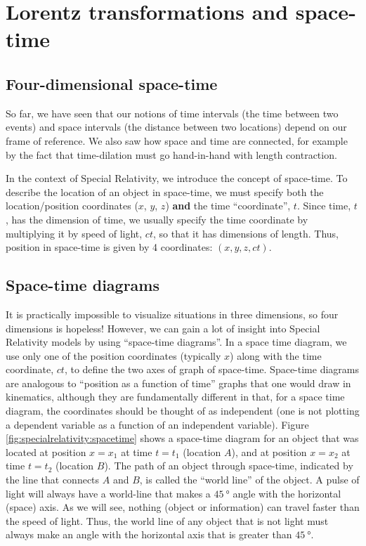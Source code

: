 \section{Lorentz transformations and space-time}
\subsection{Four-dimensional space-time}
So far, we have seen that our notions of time intervals (the time between two events) and space intervals (the distance between two locations) depend on our frame of reference. We also saw how space and time are connected, for example by the fact that time-dilation must go hand-in-hand with length contraction.

In the context of Special Relativity, we introduce the concept of space-time. To describe the location of an object in space-time, we must specify both the location/position coordinates ($x$, $y$, $z$) \textbf{and} the time ``coordinate'', $t$. Since time, $t$, has the dimension of time, we usually specify the time coordinate by multiplying it by speed of light, $ct$, so that it has dimensions of length. Thus, position in space-time is given by 4 coordinates: $(x,y,z,ct)$.

 
\subsection{Space-time diagrams}
It is practically impossible to visualize situations in three dimensions, so four dimensions is hopeless! However, we can gain a lot of insight into Special Relativity models by using ``space-time diagrams''. In a space time diagram, we use only one of the position coordinates (typically $x$) along with the time coordinate, $ct$, to define the two axes of graph of space-time. Space-time diagrams are analogous to ``position as a function of time'' graphs that one would draw in kinematics, although they are fundamentally different in that, for a space time diagram, the coordinates should be thought of as independent (one is not plotting a dependent variable as a function of an independent variable).
Figure \ref{fig:specialrelativity:spacetime} shows a space-time diagram for an object that was located at position $x=x_1$ at time $t=t_1$ (location $A$), and at position $x=x_2$ at time $t=t_2$ (location $B$). The path of an object through space-time, indicated by the line that connects $A$ and $B$, is called the ``world line'' of the object.
A pulse of light will always have a world-line that makes a $\SI{45}{\degree}$ angle with the horizontal (space) axis. As we will see, nothing (object or information) can travel faster than the speed of light. Thus, the world line of any object that is not light must always make an angle with the horizontal axis that is greater than $\SI{45}{\degree}$.


